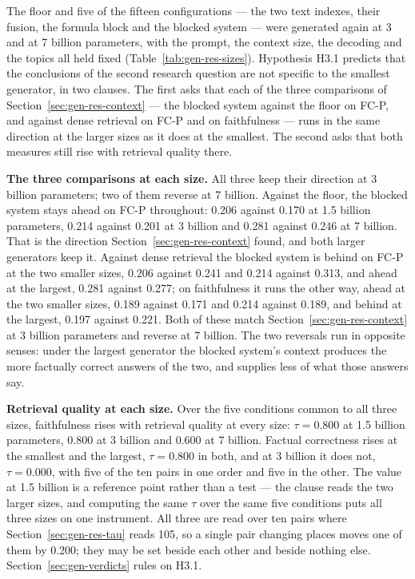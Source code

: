 The floor and five of the fifteen configurations --- the two text indexes, their fusion, the formula
block and the blocked system --- were generated again at 3 and at 7 billion parameters, with the
prompt, the context size, the decoding and the topics all held fixed
(Table~\ref{tab:gen-res-sizes}). Hypothesis H3.1 predicts that the conclusions of the second
research question are not specific to the smallest generator, in two clauses. The first asks that
each of the three comparisons of Section~\ref{sec:gen-res-context} --- the blocked system against
the floor on FC-P, and against dense retrieval on FC-P and on faithfulness --- runs in the same
direction at the larger sizes as it does at the smallest. The second asks that both measures still
rise with retrieval quality there.

\textbf{The three comparisons at each size.} All three keep their direction at 3 billion
parameters; two of them reverse at 7 billion. Against the floor, the blocked system stays ahead on
FC-P throughout: 0.206 against 0.170 at 1.5 billion parameters, 0.214 against 0.201 at 3 billion
and 0.281 against 0.246 at 7 billion. That is the direction
Section~\ref{sec:gen-res-context} found, and both larger generators keep it. Against dense
retrieval the blocked system is behind on FC-P at the two smaller sizes, 0.206 against 0.241 and
0.214 against 0.313, and ahead at the largest, 0.281 against 0.277; on faithfulness it runs the
other way, ahead at the two smaller sizes, 0.189 against 0.171 and 0.214 against 0.189, and behind
at the largest, 0.197 against 0.221. Both of these match
Section~\ref{sec:gen-res-context} at 3 billion parameters and reverse at 7 billion. The two
reversals run in opposite senses: under the largest generator the blocked system's context produces
the more factually correct answers of the two, and supplies less of what those answers say.

\textbf{Retrieval quality at each size.} Over the five conditions common to all three sizes,
faithfulness rises with retrieval quality at every size: $\tau = 0.800$ at 1.5 billion parameters,
0.800 at 3 billion and 0.600 at 7 billion. Factual correctness rises at the smallest and the
largest, $\tau = 0.800$ in both, and at 3 billion it does not, $\tau = 0.000$, with five of the ten
pairs in one order and five in the other. The value at 1.5 billion is a reference point rather than
a test --- the clause reads the two larger sizes, and computing the same $\tau$ over the same
five conditions puts all three sizes on one instrument. All three are read over ten pairs where
Section~\ref{sec:gen-res-tau} reads 105, so a single pair changing places moves one of them by
0.200; they may be set beside each other and beside nothing else. Section~\ref{sec:gen-verdicts} rules on H3.1.

